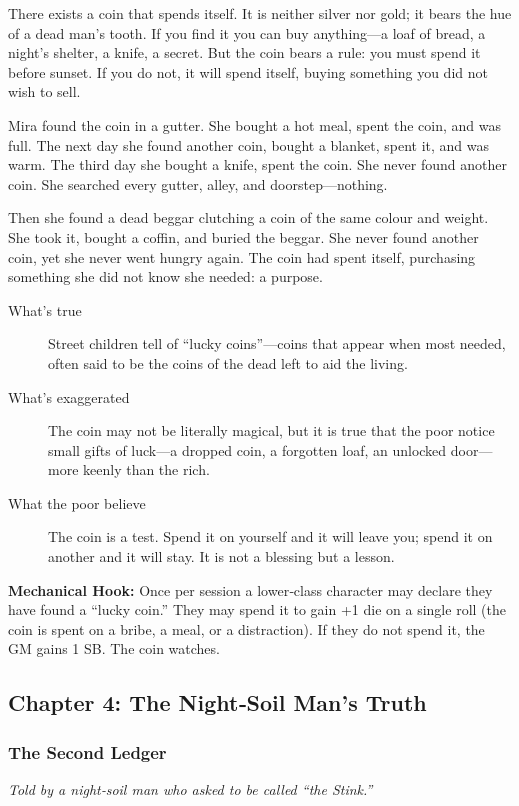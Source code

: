 \documentclass[11pt]{article}
\begin{document}
There exists a coin that spends itself. It is neither silver nor gold; it bears the hue of a dead man's tooth. If you find it you can buy anything—a loaf of bread, a night’s shelter, a knife, a secret. But the coin bears a rule: you must spend it before sunset. If you do not, it will spend itself, buying something you did not wish to sell.

Mira found the coin in a gutter. She bought a hot meal, spent the coin, and was full. The next day she found another coin, bought a blanket, spent it, and was warm. The third day she bought a knife, spent the coin. She never found another coin. She searched every gutter, alley, and doorstep—nothing.

Then she found a dead beggar clutching a coin of the same colour and weight. She took it, bought a coffin, and buried the beggar. She never found another coin, yet she never went hungry again. The coin had spent itself, purchasing something she did not know she needed: a purpose.

\begin{description}
\item[What's true] Street children tell of “lucky coins”—coins that appear when most needed, often said to be the coins of the dead left to aid the living.
\item[What's exaggerated] The coin may not be literally magical, but it is true that the poor notice small gifts of luck—a dropped coin, a forgotten loaf, an unlocked door—more keenly than the rich.
\item[What the poor believe] The coin is a test. Spend it on yourself and it will leave you; spend it on another and it will stay. It is not a blessing but a lesson.
\end{description}

\textbf{Mechanical Hook:} Once per session a lower‑class character may declare they have found a “lucky coin.” They may spend it to gain +1 die on a single roll (the coin is spent on a bribe, a meal, or a distraction). If they do not spend it, the GM gains 1 SB. The coin watches.

\subsection{Chapter 4: The Night‑Soil Man's Truth}
\subsubsection{The Second Ledger}
\textit{Told by a night‑soil man who asked to be called “the Stink.”}
\end{document}
